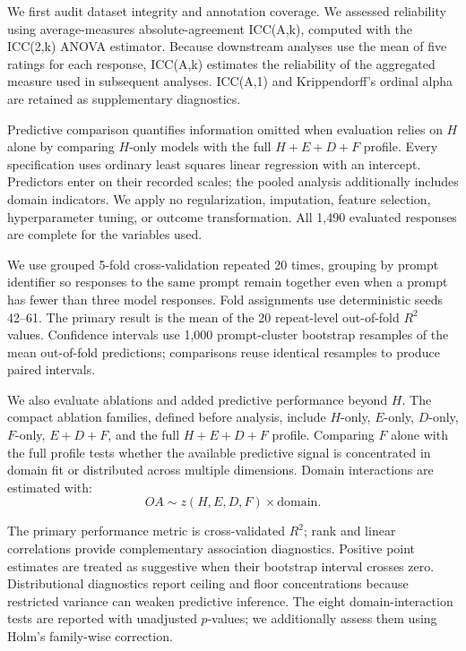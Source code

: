 \documentclass[manuscript,review,anonymous]{acmart}
\begin{document}
We first audit dataset integrity and annotation coverage. We assessed reliability using average-measures absolute-agreement ICC(A,k), computed with the ICC(2,k) ANOVA estimator. Because downstream analyses use the mean of five ratings for each response, ICC(A,k) estimates the reliability of the aggregated measure used in subsequent analyses. ICC(A,1) and Krippendorff's ordinal alpha are retained as supplementary diagnostics.

Predictive comparison quantifies information omitted when evaluation relies on $H$ alone by comparing $H$-only models with the full $H+E+D+F$ profile. Every specification uses ordinary least squares linear regression with an intercept. Predictors enter on their recorded scales; the pooled analysis additionally includes domain indicators. We apply no regularization, imputation, feature selection, hyperparameter tuning, or outcome transformation. All 1,490 evaluated responses are complete for the variables used.

We use grouped 5-fold cross-validation repeated 20 times, grouping by prompt identifier so responses to the same prompt remain together even when a prompt has fewer than three model responses. Fold assignments use deterministic seeds 42--61. The primary result is the mean of the 20 repeat-level out-of-fold $R^2$ values. Confidence intervals use 1,000 prompt-cluster bootstrap resamples of the mean out-of-fold predictions; comparisons reuse identical resamples to produce paired intervals.

We also evaluate ablations and added predictive performance beyond $H$. The compact ablation families, defined before analysis, include $H$-only, $E$-only, $D$-only, $F$-only, $E+D+F$, and the full $H+E+D+F$ profile. Comparing $F$ alone with the full profile tests whether the available predictive signal is concentrated in domain fit or distributed across multiple dimensions. Domain interactions are estimated with:
\[
OA \sim z(H,E,D,F)\times \text{domain}.
\]

The primary performance metric is cross-validated $R^2$; rank and linear correlations provide complementary association diagnostics. Positive point estimates are treated as suggestive when their bootstrap interval crosses zero. Distributional diagnostics report ceiling and floor concentrations because restricted variance can weaken predictive inference. The eight domain-interaction tests are reported with unadjusted $p$-values; we additionally assess them using Holm's family-wise correction.
\end{document}

